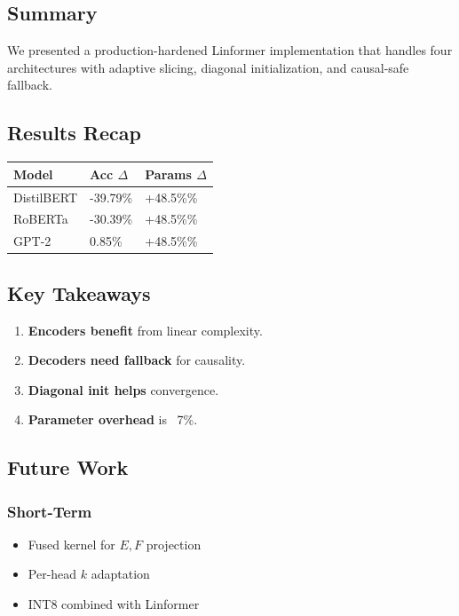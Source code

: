 \subsection{Summary}

We presented a production-hardened Linformer implementation that handles 
four architectures with adaptive slicing, diagonal initialization, and 
causal-safe fallback.

\subsection{Results Recap}

\begin{table}[H]
\centering
\small
\begin{tabular}{lll}
\toprule
\textbf{Model} & \textbf{Acc $\Delta$} & \textbf{Params $\Delta$} \\
\midrule
DistilBERT & -39.79\% & +48.5\%\% \\
RoBERTa & -30.39\% & +48.5\%\% \\
GPT-2 & 0.85\% & +48.5\%\% \\
\bottomrule
\end{tabular}
\end{table}

\subsection{Key Takeaways}

\begin{enumerate}
\item \textbf{Encoders benefit} from linear complexity.
\item \textbf{Decoders need fallback} for causality.
\item \textbf{Diagonal init helps} convergence.
\item \textbf{Parameter overhead} is ~7\%.

\end{enumerate}
\subsection{Future Work}

\subsubsection{Short-Term}
\begin{itemize}
\item Fused kernel for $E, F$ projection
\item Per-head $k$ adaptation
\item INT8 combined with Linformer

\end{itemize}
